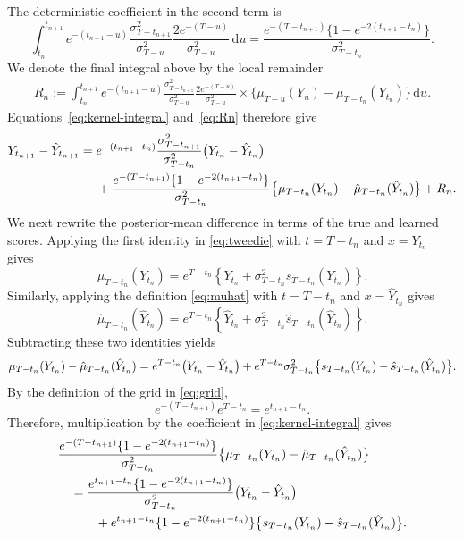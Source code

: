\documentclass[11pt]{article}
\theoremstyle{definition}
\newcommand{\dd}{\,\mathrm{d}}
\begin{document}
The deterministic coefficient in the second term is
\begin{equation}
\int_{t_n}^{t_{n+1}}
 e^{-(t_{n+1}-u)}
 \frac{\sigma_{T-t_{n+1}}^2}{\sigma_{T-u}^2}
 \frac{2e^{-(T-u)}}{\sigma_{T-u}^2}\dd u
 =\frac{e^{-(T-t_{n+1})}\{1-e^{-2(t_{n+1}-t_n)}\}}
 {\sigma_{T-t_n}^2}.
\label{eq:kernel-integral}
\end{equation}
We denote the final integral above by the local remainder
\begin{align}
    R_n:=\int_{t_n}^{t_{n+1}}
 e^{-(t_{n+1}-u)}
 \frac{\sigma_{T-t_{n+1}}^2}{\sigma_{T-u}^2}
 \frac{2e^{-(T-u)}}{\sigma_{T-u}^2}
 \times\bigl\{\mu_{T-u}(Y_u)-\mu_{T-t_n}(Y_{t_n})\bigr\}\dd u.
\label{eq:Rn}
\end{align}
Equations~\eqref{eq:kernel-integral} and~\eqref{eq:Rn} therefore give
\begin{align}
Y_{t_{n+1}}-\hat Y_{t_{n+1}}
={}&e^{-(t_{n+1}-t_n)}
\frac{\sigma_{T-t_{n+1}}^2}{\sigma_{T-t_n}^2}
\bigl(Y_{t_n}-\hat Y_{t_n}\bigr)\notag\\
&+\frac{
    e^{-(T-t_{n+1})}\{1-e^{-2(t_{n+1}-t_n)}\}
}{
    \sigma_{T-t_n}^2
}
\bigl\{
    \mu_{T-t_n}(Y_{t_n})
    -\hat\mu_{T-t_n}(\hat Y_{t_n})
\bigr\}
+R_n.\notag
\end{align}
We next rewrite the posterior-mean difference in terms of the true
and learned scores. Applying the first identity in
\eqref{eq:tweedie} with
$t=T-t_n$ and $x=Y_{t_n}$ gives
\[
\mu_{T-t_n}(Y_{t_n})
=e^{T-t_n}
\left\{
    Y_{t_n}
    +\sigma_{T-t_n}^2s_{T-t_n}(Y_{t_n})
\right\}.
\]
Similarly, applying the definition \eqref{eq:muhat} with
$t=T-t_n$ and $x=\hat Y_{t_n}$ gives
\[
\hat\mu_{T-t_n}(\hat Y_{t_n})
=e^{T-t_n}
\left\{
    \hat Y_{t_n}
    +\sigma_{T-t_n}^2
        \hat s_{T-t_n}(\hat Y_{t_n})
\right\}.
\]
Subtracting these two identities yields
\begin{align}
\mu_{T-t_n}(Y_{t_n})
-\hat\mu_{T-t_n}(\hat Y_{t_n})
=
e^{T-t_n}\bigl(Y_{t_n}-\hat Y_{t_n}\bigr)
+e^{T-t_n}\sigma_{T-t_n}^2
\bigl\{
    s_{T-t_n}(Y_{t_n})
    -\hat s_{T-t_n}(\hat Y_{t_n})
\bigr\}.\notag
\end{align}
By the definition of the grid in \eqref{eq:grid},
\[
    e^{-(T-t_{n+1})}e^{T-t_n}=e^{t_{n+1}-t_n}.
\]
Therefore, multiplication by the coefficient in
\eqref{eq:kernel-integral} gives
\begin{align}
&\frac{
    e^{-(T-t_{n+1})}\{1-e^{-2(t_{n+1}-t_n)}\}
}{
    \sigma_{T-t_n}^2
}
\bigl\{
    \mu_{T-t_n}(Y_{t_n})
    -\hat\mu_{T-t_n}(\hat Y_{t_n})
\bigr\}\notag\\
&\quad=
\frac{e^{t_{n+1}-t_n}\{1-e^{-2(t_{n+1}-t_n)}\}}
{\sigma_{T-t_n}^2}
\bigl(Y_{t_n}-\hat Y_{t_n}\bigr)\notag\\
&\qquad\quad
{}+e^{t_{n+1}-t_n}\{1-e^{-2(t_{n+1}-t_n)}\}
\bigl\{
    s_{T-t_n}(Y_{t_n})
    -\hat s_{T-t_n}(\hat Y_{t_n})
\bigr\}.\notag
\end{align}
\end{document}
